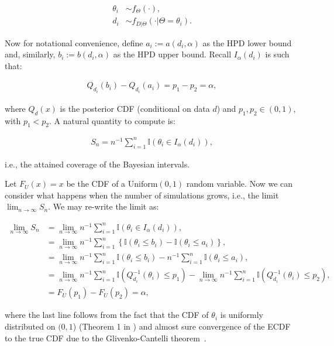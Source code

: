 \documentclass[oneside]{article}
\begin{document}
\begin{align*}
\theta_i & \sim f_\Theta(\cdot), \\
d_i & \sim f_{D|\Theta}(\cdot | \Theta=\theta_i).
\end{align*}

Now for notational convenience, define $a_i := a(d_i, \alpha)$ as the HPD lower bound and, similarly, $b_i := b(d_i, \alpha)$ as the HPD upper bound.
Recall $I_{\alpha}\left(d_i\right)$ is such that:


\begin{align*}
Q_{d_i}\left(b_i\right) - Q_{d_i}\left(a_i\right) = p_1 - p_2 = \alpha,
\end{align*}

\noindent where $Q_{d}(x)$ is the posterior CDF (conditional on data $d$) and $p_1, p_2 \in (0,1)$, with $p_1 < p_2$.
A natural quantity to compute is:

\begin{align*}
S_n = n^{-1}\sum_{i=1}^n \mathbb{I}\left(\theta_i \in I_{\alpha}\left(d_i\right) \right),
\end{align*}

\noindent i.e., the attained coverage of the Bayesian intervals.

Let $F_U(x) = x$ be the CDF of a $\operatorname{Uniform(0, 1)}$ random variable. 
Now we can consider what happens when the number of simulations grows, i.e., the limit $\lim_{n \to \infty} S_n$.
We may re-write the limit as:

\begin{align*}
\lim_{n \to \infty} S_n &= \lim_{n \to \infty} n^{-1}\sum_{i=1}^n \mathbb{I}\left(\theta_i \in I_{\alpha}\left(d_i\right) \right),\\
&=  \lim_{n \to \infty} n^{-1}\sum_{i=1}^n \left\{ \mathbb{I}\left(\theta_i \leq b_i \right) - \mathbb{I}\left(\theta_i \leq a_i \right) \right\},\\
&=  \lim_{n \to \infty} n^{-1}\sum_{i=1}^n \mathbb{I}\left(\theta_i \leq b_i \right) -  n^{-1}\sum_{i=1}^n\mathbb{I}\left(\theta_i \leq a_i \right),\\
&=  \lim_{n \to \infty} n^{-1}\sum_{i=1}^n \mathbb{I}\left(Q_{d_i}^{-1}\left(\theta_i\right) \leq p_1 \right) -   \lim_{n \to \infty} n^{-1}\sum_{i=1}^n\mathbb{I}\left(Q_{d_i}^{-1}\left(\theta_i\right) \leq p_2 \right),\\
&= F_U(p_1) - F_U(p_2) = \alpha,
\end{align*}

\noindent where the last line follows from the fact that the CDF of $\theta_i$ is uniformly distributed on $(0, 1$) (Theorem 1 in \citealp{Cook06}) and almost sure convergence of the ECDF to the true CDF due to the  Glivenko-Cantelli theorem~\cite[page 275]{Billingsley1986}.

\end{document}
